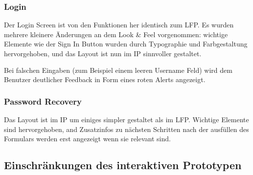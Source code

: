 \documentclass[a4paper,10pt]{article}
\begin{document}
\begin{comment}
Beschreiben Sie kurz die Umsetzung Ihres interaktiven Prototypen. Insbesondere sollen darin folgende Fragen beantwortet werden (jeweils soweit sie auf Ihren Entwicklungsprozess anwendbar sind):

Welche Änderungen waren bei der Umsetzung des interaktiven Prototypen im Vergleich zu Ihrem ursprünglichen Konzept notwendig und weshalb (technische Einschränkungen, Komplexität, ...)?

Welche Aspekte waren in Ihrem ursprünglichen Konzept unterspezifiziert und mussten bei der Umsetzung konkretisiert werden?

Auf welche Schwächen und Probleme in Ihrem Konzept sind Sie bei der Umsetzung des interaktiven Prototypen aufmerksam geworden?


Illustrieren Sie Abweichungen anhand von Wireframes aus Ihrem ursprünglichen Konzept und stellen Sie sie Screenshots aus dem interaktiven Prototypen gegenüber. Heben Sie ggf. spezifische Details graphisch oder in Form von Anmerkungen hervor.
\end{comment}

\subsubsection{Login}


Der Login Screen ist von den Funktionen her identisch zum LFP. Es wurden mehrere
kleinere \"Anderungen an dem Look \& Feel vorgenommen: wichtige Elemente wie der
Sign In Button wurden durch Typographie und Farbgestaltung hervorgehoben, und das Layout
ist nun im IP sinnvoller gestaltet.

Bei falschen Eingaben (zum Beispiel einem leeren Username Feld) wird dem Benutzer
deutlicher Feedback in Form eines roten Alerts angezeigt.

\subsubsection{Password Recovery}


Das Layout ist im IP um einiges simpler gestaltet als im LFP. Wichtige Elemente
sind hervorgehoben, and Zusatzinfos zu n\"achsten Schritten nach der ausf\"ullen
des Formulars werden erst angezeigt wenn sie relevant sind.


\clearpage
\subsection{Einschränkungen des interaktiven Prototypen}

\begin{comment}
Welche Aspekte konnten in Ihrem interaktiven Prototypen nur unvollständig umgesetzt werden (z.B. weil der Umsetzungsaufwand zu hoch wäre)? Beschreiben Sie eventuelle Kompromisslösungen ausreichend genau, dass Ihre geplante und beabsichtigte Funktionsweise für den Leser klar verständlich und nachvollziehbar ist.
\end{comment}
\end{document}
